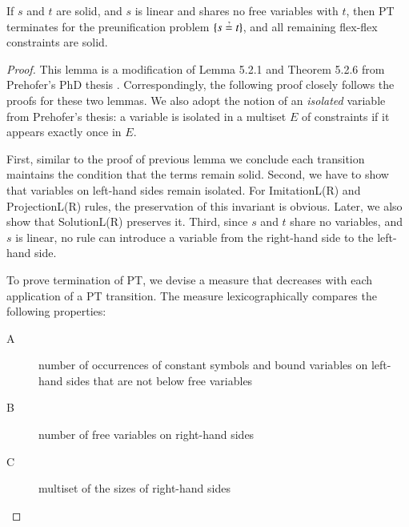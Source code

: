 \begin{lemma}
  \label{unif:lemma:solid-termination-preunif}
  If $s$ and $t$ are solid, and $s$ is linear and shares no free variables with $t$, then
  PT terminates for the preunification problem $\{ s \unif t \}$, and
  all remaining flex-flex constraints are solid.
\end{lemma}
\begin{proof}
  This lemma is a modification of Lemma 5.2.1 and Theorem 5.2.6 from Prehofer's
  PhD thesis \cite{cp-95-unifphd}. Correspondingly, the following proof closely
  follows the proofs for these two lemmas. We also adopt the notion of an
  \emph{isolated} variable from Prehofer's thesis: a variable is isolated in a
  multiset $E$ of constraints if it appears exactly once in $E$.

  First, similar to the proof of previous lemma we conclude each transition
  maintains the condition that the terms remain solid. Second, we have to show
  that variables on left-hand sides remain isolated. For \textsf{ImitationL(R)} and
  \textsf{ProjectionL(R)} rules, the preservation of this invariant is obvious.
  Later, we also show that \textsf{SolutionL(R)} preserves it. Third, since $s$ and
  $t$ share no variables, and $s$ is linear, no rule can introduce a variable
  from the right-hand side to the left-hand side.
  
  To prove termination of PT, we devise a measure that
  decreases with each application of a PT transition. The measure
  lexicographically compares the following properties:
  \begin{description}
    \item[A] number of occurrences of constant symbols and bound variables on left-hand sides that
    are not below free variables
    \item[B] number of free variables on right-hand sides
    \item[C] multiset of the sizes of right-hand sides
  \end{description}
  

\end{proof}
